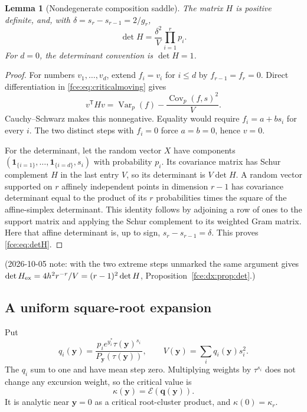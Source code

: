 \documentclass[11pt,a4paper]{article}
\numberwithin{equation}{section}
\newtheorem{lemma}[theorem]{Lemma}
\theoremstyle{definition}\newtheorem{definition}[theorem]{Definition}
\theoremstyle{remark}\newtheorem{remark}[theorem]{Remark}
\newcommand{\E}{\mathcal E}
\newcommand{\Var}{\operatorname{Var}}
\newcommand{\Cov}{\operatorname{Cov}}
\begin{document}
\begin{lemma}[Nondegenerate composition saddle]\label{fce:lem:hessian}
The matrix $H$ is positive definite, and, with
$\delta=s_r-s_{r-1}=2/g_r$,
\begin{equation}\label{fce:eq:detH}
 \det H=\frac{\delta^2}{V}\prod_{i=1}^r p_i.
\end{equation}
For $d=0$, the determinant convention is $\det H=1$.
\end{lemma}
\begin{proof}
For numbers $v_1,\ldots,v_d$, extend $f_i=v_i$ for $i\le d$ by
$f_{r-1}=f_r=0$. Direct differentiation in \eqref{fce:eq:criticalmoving} gives
\[
 v^{\mathsf T}Hv=\Var_p(f)-\frac{\Cov_p(f,s)^2}{V}.
\]
Cauchy--Schwarz makes this nonnegative. Equality would require $f_i=a+bs_i$
for every $i$. The two distinct steps with $f_i=0$ force $a=b=0$, hence
$v=0$.

For the determinant, let the random vector $X$ have components
$(\boldsymbol1_{\{i=1\}},\ldots,\boldsymbol1_{\{i=d\}},s_i)$ with
probability $p_i$. Its covariance matrix has Schur complement $H$ in the
last entry $V$, so its determinant is $V\det H$. A random vector supported
on $r$ affinely independent points in dimension $r-1$ has covariance
determinant equal to the product of its $r$ probabilities times the square
of the affine-simplex determinant. This identity follows by adjoining a
row of ones to the support matrix and applying the Schur complement to
its weighted Gram matrix. Here that affine determinant is, up to sign,
$s_r-s_{r-1}=\delta$. This proves \eqref{fce:eq:detH}.
\end{proof}
(2026-10-05 note: with the two extreme steps unmarked the same argument gives
$\det H_{\rm ex}=4h^2r^{-r}/V=(r-1)^2\det H$,
Proposition~\ref{fce:dx:prop:det}.)

\subsection{A uniform square-root expansion}
Put
\begin{equation}\label{fce:eq:tiltedprob}
 q_i(\boldsymbol y)=
 \frac{p_i e^{y_i^*}\tau(\boldsymbol y)^{s_i}}
      {P_{\boldsymbol y}(\tau(\boldsymbol y))},\qquad
 V(\boldsymbol y)=\sum_i q_i(\boldsymbol y)s_i^2.
\end{equation}
The $q_i$ sum to one and have mean step zero. Multiplying weights by
$\tau^{s_i}$ does not change any excursion weight, so the critical value is
\[
 \kappa(\boldsymbol y)=\E(\boldsymbol q(\boldsymbol y)).
\]
It is analytic near $\boldsymbol y=0$ as a critical root-cluster product,
and $\kappa(0)=\kappa_r$.
\end{document}
